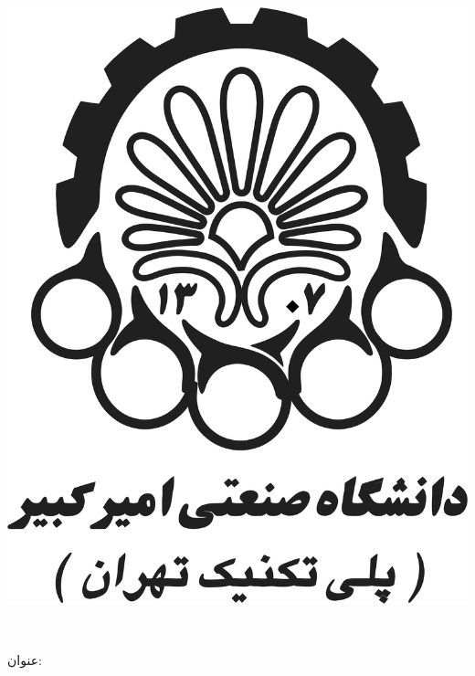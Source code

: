 
\begin{center}

\includegraphics[scale=0.2]{images/logo.png}

\vspace{0.3cm}
\large\ThesisDepartment\\

\begin{large}
\vspace{0.5cm}



\end{large}

\vspace{1.5cm}

{عنوان:}\\[1.2em]
{\LARGE\textbf{\ThesisTitle}}\\ 
\vspace{1cm}


\end{center}
